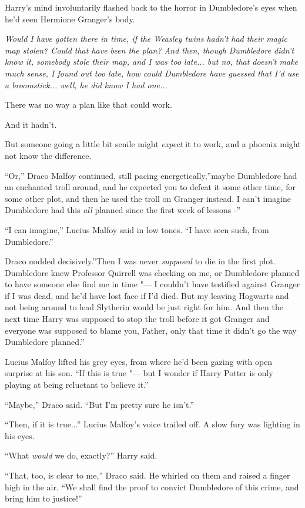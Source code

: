 Harry's mind involuntarily flashed back to the horror in Dumbledore's
eyes when he'd seen Hermione Granger's body.

\emph{Would I have gotten there in time, if the Weasley twins hadn't had
their magic map stolen? Could that have been the plan? And then, though
Dumbledore didn't know it, somebody stole their map, and I was too
late... but no, that doesn't make much sense, I found out too late,
how could Dumbledore have guessed that I'd use a broomstick...
well, he did know I had one...}

There was no way a plan like that could work.

And it hadn't.

But someone going a little bit senile might \emph{expect} it to work,
and a phoenix might not know the difference.

``Or,'' Draco Malfoy continued, still pacing energetically,''maybe
Dumbledore had an enchanted troll around, and he expected you to defeat
it some other time, for some other plot, and then he used the troll on
Granger instead. I can't imagine Dumbledore had this \emph{all} planned
since the first week of lessons -''

``I can imagine,'' Lucius Malfoy said in low tones. ``I have seen such,
from Dumbledore.''

Draco nodded decisively.''Then I was never \emph{supposed} to die in the
first plot. Dumbledore knew Professor Quirrell was checking on me, or
Dumbledore planned to have someone else find me in time "--- I couldn't
have testified against Granger if I was dead, and he'd have lost face if
I'd died. But my leaving Hogwarts and not being around to lead Slytherin
would be just right for him. And then the next time Harry was supposed
to stop the troll before it got Granger and everyone was supposed to
blame you, Father, only that time it didn't go the way Dumbledore
planned.''

Lucius Malfoy lifted his grey eyes, from where he'd been gazing with
open surprise at his son. ``If this is true "--- but I wonder if Harry
Potter is only playing at being reluctant to believe it.''

``Maybe,'' Draco said. ``But I'm pretty sure he isn't.''

``Then, if it is true...'' Lucius Malfoy's voice trailed off. A
slow fury was lighting in his eyes.

``What \emph{would} we do, exactly?'' Harry said.

``That, too, is clear to me,'' Draco said. He whirled on them and raised
a finger high in the air. ``We shall find the proof to convict
Dumbledore of this crime, and bring him to justice!''

